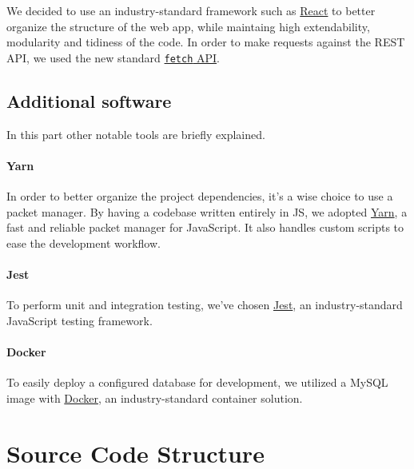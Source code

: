 \documentclass[
]{article}
\begin{document}
We decided to use an industry-standard framework such as
\href{https://reactjs.org/}{React} to better organize the structure of
the web app, while maintaing high extendability, modularity and tidiness
of the code. In order to make requests against the REST API, we used the
new standard
\href{https://developer.mozilla.org/en-US/docs/Web/API/Fetch_API}{\texttt{fetch}
API}.

\hypertarget{additional-software}{%
\subsection{Additional software}\label{additional-software}}

In this part other notable tools are briefly explained.

\hypertarget{yarn}{%
\paragraph{Yarn}\label{yarn}}

In order to better organize the project dependencies, it's a wise choice
to use a packet manager. By having a codebase written entirely in JS, we
adopted \href{https://yarnpkg.com/}{Yarn}, a fast and reliable packet
manager for JavaScript. It also handles custom scripts to ease the
development workflow.

\hypertarget{jest}{%
\paragraph{Jest}\label{jest}}

To perform unit and integration testing, we've chosen
\href{https://jestjs.io/}{Jest}, an industry-standard JavaScript testing
framework.

\hypertarget{docker}{%
\paragraph{Docker}\label{docker}}

To easily deploy a configured database for development, we utilized a
MySQL image with \href{https://www.docker.com/}{Docker}, an
industry-standard container solution.

\hypertarget{source-code-structure}{%
\section{Source Code Structure}\label{source-code-structure}}
\end{document}
